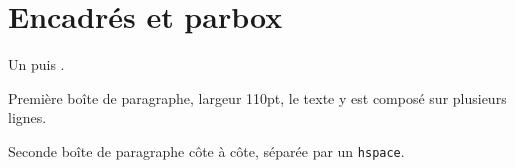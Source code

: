 \documentclass{article}
\begin{document}
\hsize=380pt
\section{Encadr\'es et parbox}
Un  puis .

\parbox{110pt}{Premi\`ere bo\^ite de paragraphe, largeur 110pt, le texte y est compos\'e sur plusieurs lignes.}\hspace{16pt}\parbox{110pt}{Seconde bo\^ite de paragraphe c\^ote \`a c\^ote, s\'epar\'ee par un \texttt{hspace}.}
\end{document}
